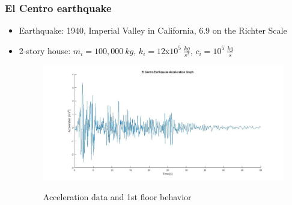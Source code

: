 \documentclass[xcolor=svgnames,9pt]{beamer}
\theoremstyle{remark}
\begin{document}
		\begin{frame}
  			\frametitle{El Centro earthquake}
			\begin{itemize}
				\item  Earthquake: 1940, Imperial Valley in California, 6.9 on the Richter Scale
				\item 2-story house: $m_i = 100,000\  kg$, $k_i = 12\text{x}10^5\  \frac{kg}{s^2}$, $c_i = 10^5\ \frac{kg}{s}$
				\begin{figure}[h!]
   					\centering
   					\includegraphics[width=120mm]{ElCentro.jpg}
				           \label{fig10}
					\caption{Acceleration data and 1st floor behavior}
  				\end{figure}
			\end{itemize}
		\end{frame}
\end{document}
